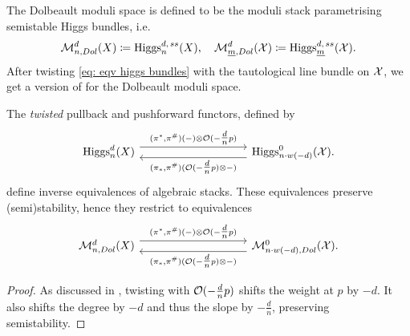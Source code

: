 \documentclass{article}
\begin{document}
The Dolbeault moduli space is defined to be the moduli stack parametrising semistable Higgs bundles, i.e.
\begin{equation}
\mathcal{M}_{n, Dol}^d(X) \coloneqq \operatorname{Higgs}_n^{d, \, ss}(X), \quad \mathcal{M}_{\underline{m}, Dol}^d(\mathcal{X}) \coloneqq \operatorname{Higgs}_{\underline{m}}^{d, \, ss}(\mathcal{X}).
\end{equation}
After twisting \eqref{eq: eqv higgs bundles} with the tautological line bundle on $\mathcal{X}$, we get a version of  for the Dolbeault moduli space.
\begin{thm} \label{thm: equivalence for Higgs}
The \textit{twisted} pullback and pushforward functors, defined by
\begin{equation} \label{equivalence dol}
\begin{tikzcd}
	{\Higgs_n^d(X)} &&&& {\Higgs^0_{n \cdot w(-d)}(\mc{X}).}
	\arrow["{(\pi^*, \pi^{\#})(-) \otimes \O(-\tfrac{d}{n}p)}", shift left=2, from=1-1, to=1-5]
	\arrow["{(\pi_*, \pi^{\#})(\O(-\tfrac{d}{n}p) \otimes -)}", shift left=2, from=1-5, to=1-1]
\end{tikzcd}
\end{equation}
define inverse equivalences of algebraic stacks. These equivalences preserve (semi)stability, hence they restrict to equivalences
\begin{equation}\label{eq: equivalence of dolbeault moduli spaces}
\begin{tikzcd}
	{\mc{M}_{n, Dol}^d(X)} &&&& {\mc{M}^0_{n \cdot w(-d), Dol}(\mc{X}).}
	\arrow["{(\pi^*, \pi^{\#})(-) \otimes \O(-\tfrac{d}{n}p)}", shift left=2, from=1-1, to=1-5]
	\arrow["{(\pi_*, \pi^{\#})(\O(-\tfrac{d}{n}p) \otimes -)}", shift left=2, from=1-5, to=1-1]
\end{tikzcd}
\end{equation}
\end{thm}
\begin{proof}
As discussed in , twisting with $\mathcal{O}(-\tfrac{d}{n}p)$ shifts the weight at $p$ by $-d$. It also shifts the degree by $-d$ and thus the slope by $-\tfrac{d}{n}$, preserving semistability.
\end{proof}
\end{document}
